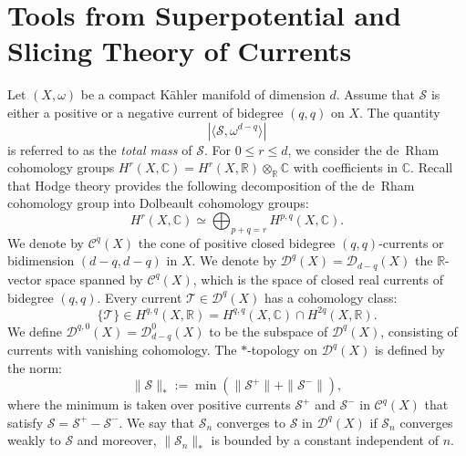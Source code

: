 \documentclass[11pt]{amsart}
\theoremstyle{definition}
\begin{document}
\section{Tools from Superpotential and Slicing Theory of Currents}

Let \((X, \omega)\) be a compact K\"ahler manifold of dimension \(d\). Assume that \(\mathcal{S}\) is either a positive or a negative current of bidegree \((q, q)\) on \(X\). The quantity 
\[
| \langle \mathscr{S}, \omega^{d-q} \rangle |
\]
is referred to as the \emph{total mass} of \(\mathscr{S}\). For \(0 \leq r \leq d\), we consider the de~Rham cohomology groups \(H^r(X, \mathbb{C}) = H^r(X, \mathbb{R}) \otimes_{\mathbb{R}} \mathbb{C}\) with coefficients in \(\mathbb{C}\). Recall that Hodge theory provides the following decomposition of the de~Rham cohomology group into Dolbeault cohomology groups:
\[
H^r(X, \mathbb{C}) \simeq \bigoplus_{p+q=r} H^{p,q}(X, \mathbb{C}).
\]
We denote by \(\mathscr{C}^q(X)\) the cone of positive closed bidegree \((q,q)\)-currents or bidimension \((d-q, d-q)\) in \(X\). We denote by \(\mathscr{D}^q(X) = \mathscr{D}_{d-q}(X)\) the \(\mathbb{R}\)-vector space spanned by \(\mathscr{C}^q(X)\), which is the space of closed real currents of bidegree \((q, q)\). Every current \(\mathscr{T} \in \mathscr{D}^q(X)\) has a cohomology class:
\[
\{\mathscr{T}\} \in H^{q,q}(X, \mathbb{R}) = H^{q,q}(X, \mathbb{C}) \cap H^{2q}(X, \mathbb{R}).
\]
We define \(\mathscr{D}^{q,0}(X) = \mathscr{D}_{d-q}^0(X)\) to be the subspace of \(\mathscr{D}^q(X)\), consisting of currents with vanishing cohomology. The \(*\)-topology on \(\mathscr{D}^q(X)\) is defined by the norm:
\[
\|\mathscr{S}\|_* := \min(\|\mathscr{S}^+\| + \|\mathscr{S}^-\|),
\]
where the minimum is taken over positive currents \(\mathscr{S}^+\) and \(\mathscr{S}^-\) in \(\mathscr{C}^q(X)\) that satisfy \(\mathscr{S} = \mathscr{S}^+ - \mathscr{S}^-\). We say that \(\mathscr{S}_n\) converges to \(\mathscr{S}\) in \(\mathscr{D}^q(X)\) if \(\mathscr{S}_n\) converges weakly to \(\mathscr{S}\) and moreover, \(\|\mathscr{S}_n\|_{*}\) is bounded by a constant independent of \(n\).
\end{document}
